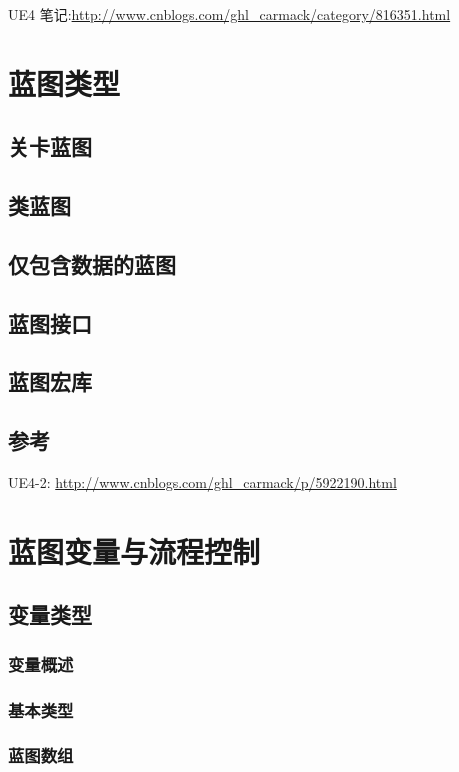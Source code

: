 \documentclass[UTF8,a4paper,12pt]{ctexbook}
\begin{document}
			UE4 笔记:\url{http://www.cnblogs.com/ghl_carmack/category/816351.html}
			
			

\chapter{蓝图类型}
	\section{关卡蓝图}

	\section{类蓝图}
	
	\section{仅包含数据的蓝图}
	
	\section{蓝图接口}
	
	\section{蓝图宏库}
	
	\section{参考} 
		UE4-2: \url{http://www.cnblogs.com/ghl_carmack/p/5922190.html}
	
	
\chapter{蓝图变量与流程控制}
	\section{变量类型}
		\subsection{变量概述}
		
		\subsection{基本类型}
		
		\subsection{蓝图数组}
\end{document}
